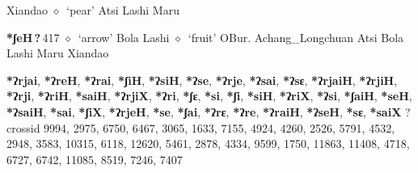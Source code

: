 \begin{list}{}{\leftmargin=1.5em \itemindent=-1.5em}
         Xiandao 
\hspace{1ex}
         $\diamond$~`pear'
         Atsi 
\hspace{1ex}
         Lashi 
\hspace{1ex}
         Maru 
  \item {\footnotesize \textbf{*ʃeH\,?\,}}{\tiny 417}
\hspace{1ex}
         $\diamond$~`arrow'
         Bola 
\hspace{1ex}
         Lashi 
\hspace{1ex}
         $\diamond$~`fruit'
         OBur. 
\hspace{1ex}
         Achang\_Longchuan 
\hspace{1ex}
         Atsi 
\hspace{1ex}
         Bola 
\hspace{1ex}
         Lashi 
\hspace{1ex}
         Maru 
\hspace{1ex}
         Xiandao 
  \end{list}
\item
\textbf{*ʔrjai}, \textbf{*ʔreH}, \textbf{*ʔrai}, \textbf{*ʃiH}, \textbf{*ʔsiH}, \textbf{*ʔse}, \textbf{*ʔrje}, \textbf{*ʔsai}, \textbf{*ʔsɛ}, \textbf{*ʔrjaiH}, \textbf{*ʔrjiH}, \textbf{*ʔrji}, \textbf{*ʔriH}, \textbf{*saiH}, \textbf{*ʔrjiX}, \textbf{*ʔri}, \textbf{*ʃɛ}, \textbf{*si}, \textbf{*ʃi}, \textbf{*siH}, \textbf{*ʔriX}, \textbf{*ʔsi}, \textbf{*ʃaiH}, \textbf{*seH}, \textbf{*ʔsaiH}, \textbf{*sai}, \textbf{*ʃiX}, \textbf{*ʔrjeH}, \textbf{*se}, \textbf{*ʃai}, \textbf{*ʔrɛ}, \textbf{*ʔre}, \textbf{*ʔraiH}, \textbf{*ʔseH}, \textbf{*sɛ}, \textbf{*saiX}
?
  {\tiny crossid 9994, 2975, 6750, 6467, 3065, 1633, 7155, 4924, 4260, 2526, 5791, 4532, 2948, 3583, 10315, 6118, 12620, 5461, 2878, 4334, 9599, 1750, 11863, 11408, 4718, 6727, 6742, 11085, 8519, 7246, 7407}
